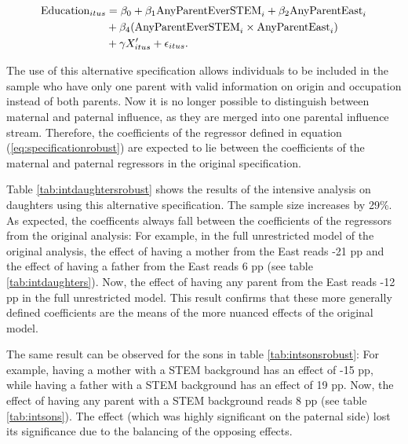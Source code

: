 \documentclass[a4paper, oneside, hyperfootnotes = false]{article}
\begin{document}
{\vspace{-8mm}

\begin{equation}
	\begin{split}
		\label{eq:specificationrobust}
		\textnormal{Education}_{itus} &={} \beta_{0} + \beta_{1}\textnormal{AnyParentEverSTEM}_{i} + \beta_{2}\textnormal{AnyParentEast}_{i} \\
		& + \beta_{4}(\textnormal{AnyParentEverSTEM}_{i} \times \textnormal{AnyParentEast}_{i}) \\
		& + \gamma{}X'_{itus} + \epsilon_{itus}\textnormal{.}
	\end{split}
\end{equation}

\noindent The use of this alternative specification allows individuals to be included in the sample who have only one parent with valid information on origin and occupation instead of both parents.
Now it is no longer possible to distinguish between maternal and paternal influence, as they are merged into one parental influence stream.
Therefore, the coefficients of the regressor defined in equation (\ref{eq:specificationrobust}) are expected to lie between the coefficients of the maternal and paternal regressors in the original specification.

Table \ref{tab:intdaughtersrobust} shows the results of the intensive analysis on daughters using this alternative specification.
The sample size increases by 29\%.
As expected, the coefficents always fall between the coefficients of the regressors from the original analysis:
For example, in the full unrestricted model of the original analysis, the effect of having a mother from the East reads -21 pp and the effect of having a father from the East reads 6 pp (see table \ref{tab:intdaughters}).
Now, the effect of having any parent from the East reads -12 pp in the full unrestricted model.
This result confirms that these more generally defined coefficients are the means of the more nuanced effects of the original model.

The same result can be observed for the sons in table \ref{tab:intsonsrobust}:
For example, having a mother with a STEM background has an effect of -15 pp, while having a father with a STEM background has an effect of 19 pp.
Now, the effect of having any parent with a STEM background reads 8 pp (see table \ref{tab:intsons}).
The effect (which was highly significant on the paternal side) lost its significance due to the balancing of the opposing effects.

}
\end{document}
